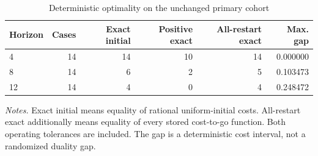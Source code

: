 \begin{table}[t]\centering\small\caption{Deterministic optimality on the unchanged primary cohort}\label{tab:primary_summary}
\begin{tabular}{lrrrrr}
\toprule
Horizon & Cases & Exact initial & Positive exact & All-restart exact & Max. gap \\
\midrule
4 & 14 & 14 & 10 & 14 & 0.000000 \\
8 & 14 & 6 & 2 & 5 & 0.103473 \\
12 & 14 & 4 & 0 & 4 & 0.248472 \\
\bottomrule\end{tabular}
\par\smallskip\begin{minipage}{\linewidth}\footnotesize\emph{Notes.} Exact initial means equality of rational uniform-initial costs. All-restart exact additionally means equality of every stored cost-to-go function. Both operating tolerances are included. The gap is a deterministic cost interval, not a randomized duality gap.\end{minipage}
\end{table}
